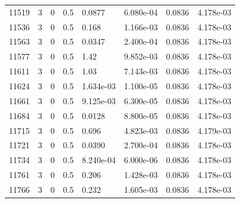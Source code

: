 \documentclass[preview]{standalone}
\begin{document}
{{{{{{{{{{{{\begin{tabular}{L{1.2cm}C{1.2cm} C{0.3cm}C{0.5cm} C{1.4cm}C{1.4cm} C{1.4cm}C{1.4cm}}
  11519  &     3  & 0     & 0.5 &  0.0877  & 6.080e-04  & 0.0836 &  4.178e-03   \\ 
  11536  &     3  & 0     & 0.5 &  0.168  & 1.166e-03  & 0.0836 &  4.178e-03   \\ 
  11563  &     3  & 0     & 0.5 &  0.0347  & 2.400e-04  & 0.0836 &  4.178e-03   \\ 
  11577  &     3  & 0     & 0.5 &  1.42  & 9.852e-03  & 0.0836 &  4.178e-03   \\ 
  11611  &     3  & 0     & 0.5 &  1.03  & 7.143e-03  & 0.0836 &  4.178e-03   \\ 
  11624  &     3  & 0     & 0.5 &  1.634e-03  & 1.100e-05  & 0.0836 &  4.178e-03   \\ 
  11661  &     3  & 0     & 0.5 &  9.125e-03  & 6.300e-05  & 0.0836 &  4.178e-03   \\ 
  11684  &     3  & 0     & 0.5 &  0.0128  & 8.800e-05  & 0.0836 &  4.178e-03   \\ 
  11715  &     3  & 0     & 0.5 &  0.696  & 4.823e-03  & 0.0836 &  4.179e-03   \\ 
  11721  &     3  & 0     & 0.5 &  0.0390  & 2.700e-04  & 0.0836 &  4.178e-03   \\ 
  11734  &     3  & 0     & 0.5 &  8.240e-04  & 6.000e-06  & 0.0836 &  4.178e-03   \\ 
  11761  &     3  & 0     & 0.5 &  0.206  & 1.428e-03  & 0.0836 &  4.178e-03   \\ 
  11766  &     3  & 0     & 0.5 &  0.232  & 1.605e-03  & 0.0836 &  4.178e-03   \\ 
\hline 
\end{tabular} 

}}}}}}}}}}}}
\end{document}
